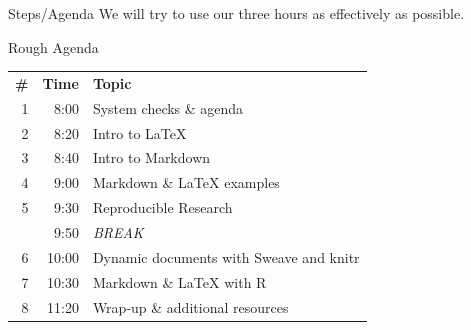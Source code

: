 \documentclass{beamer}
\begin{document}
\begin{frame}{Steps/Agenda}
\vfill
We will try to use our three hours as effectively as possible.
\begin{exampleblock}{Rough Agenda}
\begin{center}
\begin{tabular}{r|r|l}
    \textbf{\#} & \textbf{Time} & \textbf{Topic} \\
    1 & 8:00 & System checks \& agenda \\
    2 & 8:20 & Intro to LaTeX \\
    3 & 8:40 & Intro to Markdown \\
    4 & 9:00 & Markdown \& LaTeX examples \\
    5 & 9:30 & Reproducible Research \\
    \hline
     & 9:50 & \emph{BREAK} \\
    \hline
    6 & 10:00 & Dynamic documents with Sweave and knitr \\
    7 & 10:30 & Markdown \& LaTeX with R \\
    8 & 11:20 & Wrap-up \& additional resources
\end{tabular}
\end{center}
\end{exampleblock}
\end{frame}
\end{document}
